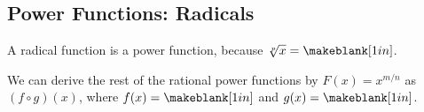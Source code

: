 \subsection{Power Functions: Radicals} 
\begin{Note}
A radical function is a power function, because $\sqrt[p]{x}=\makeblank[1in]$.
\end{Note}
\begin{Note}
We can derive the rest of the rational power functions by $F(x)=x^{m/n}$ as $(f\circ g)(x)$, where $f(x)=\makeblank[1in]$ and $g(x)=\makeblank[1in]$.
\end{Note}